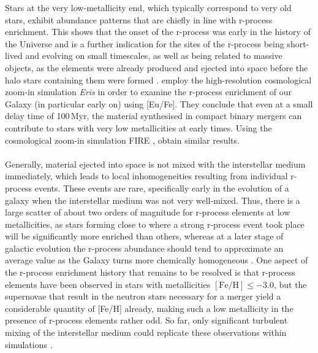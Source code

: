 \documentclass[a4paper,11pt]{article}
\begin{document}
%
Stars at the very low-metallicity end, which typically correspond to very old stars, exhibit abundance patterns that are chiefly in line with r-process enrichment. This shows that the onset of the r-process was early in the history of the Universe and is a further indication for the sites of the r-process being short-lived and evolving on small timescales, as well as being related to massive objects, as the elements were already produced and ejected into space before the halo stars containing them were formed \citep{sneden08}. \citet{shen15} employ the high-resolution cosmological zoom-in simulation {\it Eris} \citep{guedes11} in order to examine the r-process enrichment of our Galaxy (in particular early on) using [Eu/Fe]. They conclude that even at a small delay time of 100\,Myr, the material synthesised in compact binary mergers can contribute to stars with very low metallicities at early times. Using the cosmological zoom-in simulation FIRE \citep{hopkins14}, \citet{vandevoort15} obtain similar results.\\ \\
%
Generally, material ejected into space is not mixed with the interstellar medium immediately, which leads to local inhomogeneities resulting from individual r-process events. These events are rare, specifically early in the evolution of a galaxy when the interstellar medium was not very well-mixed. Thus, there is a large scatter of about two orders of magnitude for r-process elements at low metallicities, as stars forming close to where a strong r-process event took place will be significantly more enriched than others, whereas at a later stage of galactic evolution the r-process abundance should tend to approximate an average value as the Galaxy turns more chemically homogeneous \citep{thielemann17,sneden08}. One aspect of the r-process enrichment history that remains to be resolved is that r-process elements have been observed in stars with metallicities $\mathrm{[Fe/H]}\leq-3.0$, but the supernovae that result in the neutron stars necessary for a merger yield a considerable quantity of [Fe/H] already, making such a low metallicity in the presence of r-process elements rather odd. So far, only significant turbulent mixing of the interstellar medium could replicate these observations within simulations \citep{thielemann17}.\\ \\
%
\end{document}
